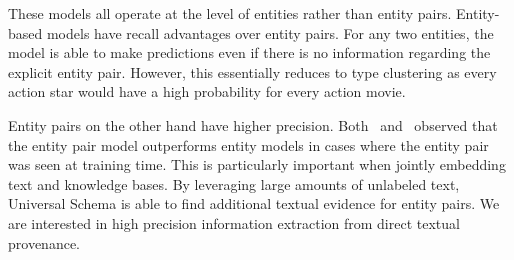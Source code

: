 These models all operate at the level of entities rather than entity pairs.
Entity-based models have recall advantages over entity pairs.
For any two entities, the model is able to make predictions even if there is no information regarding the explicit entity pair.
However, this essentially reduces to type clustering as every action star would have a high probability for every action movie.

Entity pairs on the other hand have higher precision.
Both~\citet{toutanova2015representing} and~\citet{limin} observed that the entity pair model outperforms entity models in cases where the entity pair was seen at training time.
This is particularly important when jointly embedding text and knowledge bases.
By leveraging large amounts of unlabeled text, Universal Schema is able to find additional textual evidence for entity pairs.
We are interested in high precision information extraction from direct textual provenance.
